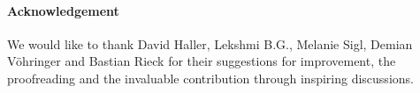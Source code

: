 \documentclass{article}
\begin{document}
\paragraph{Acknowledgement} We would like to thank David Haller, Lekshmi B.G., Melanie Sigl, Demian Vöhringer and Bastian Rieck for their suggestions for improvement, the proofreading and the invaluable contribution through inspiring discussions.


\end{document}
